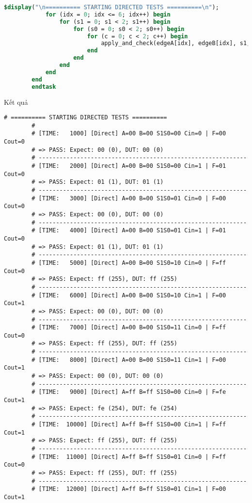 \begin{itemize}[label=-]
\begin{lstlisting}[style=StyleCode, language=SystemVerilog, caption={Thực hiện Directed Test.}]
			$display("\n========== STARTING DIRECTED TESTS ==========\n");
			for (idx = 0; idx <= 6; idx++) begin
				for (s1 = 0; s1 < 2; s1++) begin
					for (s0 = 0; s0 < 2; s0++) begin
						for (c = 0; c < 2; c++) begin
							apply_and_check(edgeA[idx], edgeB[idx], s1, s0, c, "Direct");
						end
					end
				end
			end
		end
		endtask
	\end{lstlisting}
	
	Kết quả 
	
	\begin{lstlisting}[style=StyleResult, language=Result, caption={Kết quả mô phỏng Directed Test.}]
		# ========== STARTING DIRECTED TESTS ==========
		# 
		# [TIME:   1000] [Direct] A=00 B=00 S1S0=00 Cin=0 | F=00 Cout=0
		# => PASS: Expect: 00 (0), DUT: 00 (0)
		# ------------------------------------------------------------
		# [TIME:   2000] [Direct] A=00 B=00 S1S0=00 Cin=1 | F=01 Cout=0
		# => PASS: Expect: 01 (1), DUT: 01 (1)
		# ------------------------------------------------------------
		# [TIME:   3000] [Direct] A=00 B=00 S1S0=01 Cin=0 | F=00 Cout=0
		# => PASS: Expect: 00 (0), DUT: 00 (0)
		# ------------------------------------------------------------
		# [TIME:   4000] [Direct] A=00 B=00 S1S0=01 Cin=1 | F=01 Cout=0
		# => PASS: Expect: 01 (1), DUT: 01 (1)
		# ------------------------------------------------------------
		# [TIME:   5000] [Direct] A=00 B=00 S1S0=10 Cin=0 | F=ff Cout=0
		# => PASS: Expect: ff (255), DUT: ff (255)
		# ------------------------------------------------------------
		# [TIME:   6000] [Direct] A=00 B=00 S1S0=10 Cin=1 | F=00 Cout=1
		# => PASS: Expect: 00 (0), DUT: 00 (0)
		# ------------------------------------------------------------
		# [TIME:   7000] [Direct] A=00 B=00 S1S0=11 Cin=0 | F=ff Cout=0
		# => PASS: Expect: ff (255), DUT: ff (255)
		# ------------------------------------------------------------
		# [TIME:   8000] [Direct] A=00 B=00 S1S0=11 Cin=1 | F=00 Cout=1
		# => PASS: Expect: 00 (0), DUT: 00 (0)
		# ------------------------------------------------------------
		# [TIME:   9000] [Direct] A=ff B=ff S1S0=00 Cin=0 | F=fe Cout=1
		# => PASS: Expect: fe (254), DUT: fe (254)
		# ------------------------------------------------------------
		# [TIME:  10000] [Direct] A=ff B=ff S1S0=00 Cin=1 | F=ff Cout=1
		# => PASS: Expect: ff (255), DUT: ff (255)
		# ------------------------------------------------------------
		# [TIME:  11000] [Direct] A=ff B=ff S1S0=01 Cin=0 | F=ff Cout=0
		# => PASS: Expect: ff (255), DUT: ff (255)
		# ------------------------------------------------------------
		# [TIME:  12000] [Direct] A=ff B=ff S1S0=01 Cin=1 | F=00 Cout=1

\end{lstlisting}
\end{itemize}
